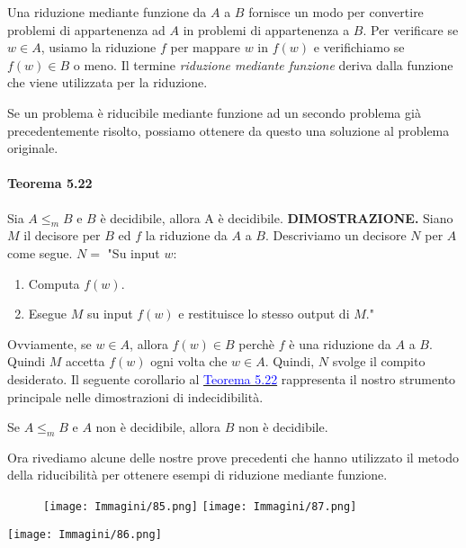 \documentclass{article}
\begin{document}
Una riduzione mediante funzione da $A$ a $B$ fornisce un modo per convertire problemi di appartenenza ad $A$ in problemi di appartenenza a $B$.
Per verificare se $w \in A$, usiamo la riduzione $f$ per mappare $w$ in $f(w)$ e verifichiamo se $f(w) \in B$ o meno.
Il termine \textit{riduzione mediante funzione} deriva dalla funzione che viene utilizzata per la riduzione.

Se un problema è riducibile mediante funzione ad un secondo problema già precedentemente risolto, possiamo ottenere da questo una soluzione al problema originale.

\paragraph{Teorema 5.22}
\label{teorema-5.22}
\text{}
\newline
Sia $A \leq_m B$ e $B$ è decidibile, allora A è decidibile.
\vspace{1em}
\text{}
\newline
\hbox{\textbf{DIMOSTRAZIONE.}}
Siano $M$ il decisore per $B$ ed $f$ la riduzione da $A$ a $B$.
Descriviamo un decisore $N$ per $A$ come segue.
\vspace{1em}
\text{}
\newline
$N = $ "Su input $w$:
\begin{enumerate}
    \item Computa $f(w)$.
    \item Esegue $M$ su input $f(w)$ e restituisce lo stesso output di $M$."
\end{enumerate}
Ovviamente, se $w \in A$, allora $f(w) \in B$ perchè $f$ è una riduzione da $A$ a $B$.
Quindi $M$ accetta $f(w)$ ogni volta che $w \in A$.
Quindi, $N$ svolge il compito desiderato.
\newpage
Il seguente corollario al \hyperref[teorema-5.22]{\textcolor{blue}{Teorema 5.22}} rappresenta il nostro strumento principale nelle dimostrazioni di indecidibilità.
\vspace{1em}
\text{}
\newline
\begin{tcolorbox}[title=Corollario 5.23]
    Se $A \leq_m B$ e $A$ non è decidibile, allora $B$ non è decidibile.
\end{tcolorbox}
Ora rivediamo alcune delle nostre prove precedenti che hanno utilizzato il metodo della riducibilità per ottenere esempi di riduzione mediante funzione.
\begin{figure}[H]
    \centering
    \texttt{[image: Immagini/85.png]}
    \texttt{[image: Immagini/87.png]}
    \label{fig:example}
\end{figure}
\texttt{[image: Immagini/86.png]}
\newpage
\end{document}
